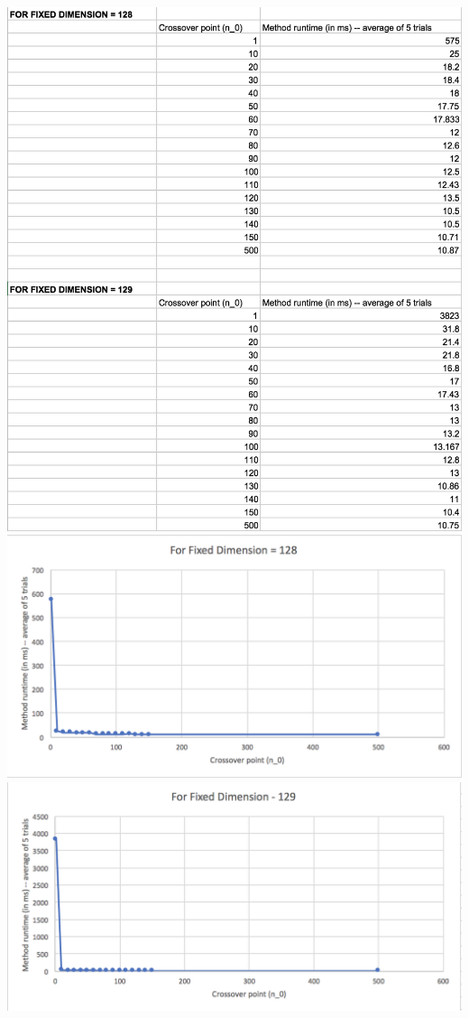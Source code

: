 \documentclass[11pt]{article}
\begin{document}
\includegraphics{runtimetable}
\includegraphics{128graph}
\includegraphics{129graph}
\end{document}
